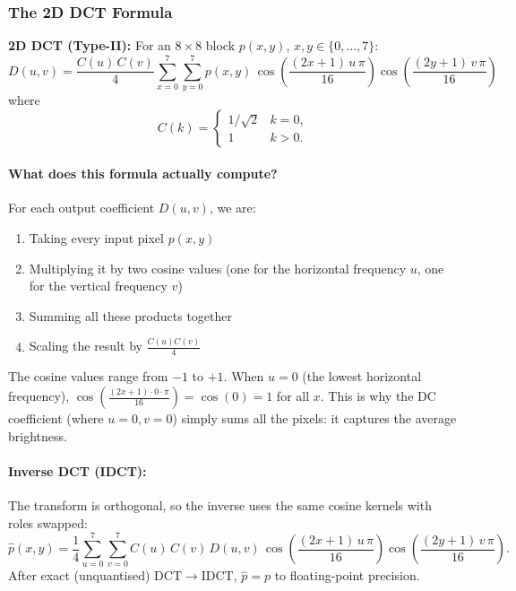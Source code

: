 \subsubsection{The 2D DCT Formula}

\begin{definitionbox}
\textbf{2D DCT (Type-II):} For an $8\times8$ block $p(x,y)$, $x,y\in\{0,\ldots,7\}$:
\begin{equation}
\boxed{
  D(u,v) = \frac{C(u)\,C(v)}{4}
  \sum_{x=0}^{7}\sum_{y=0}^{7}
  p(x,y)\,
  \cos\!\left(\frac{(2x+1)\,u\,\pi}{16}\right)
  \cos\!\left(\frac{(2y+1)\,v\,\pi}{16}\right)
}
\label{eq:dct}
\end{equation}
where
\begin{equation}
  C(k) = \begin{cases} 1/\sqrt{2} & k=0, \\ 1 & k > 0. \end{cases}
\end{equation}
\end{definitionbox}

\paragraph{What does this formula actually compute?}

For each output coefficient $D(u,v)$, we are:
\begin{enumerate}[nosep]
    \item Taking every input pixel $p(x,y)$
    \item Multiplying it by two cosine values (one for the horizontal frequency $u$, one for the vertical frequency $v$)
    \item Summing all these products together
    \item Scaling the result by $\frac{C(u)C(v)}{4}$
\end{enumerate}

The cosine values range from $-1$ to $+1$. When $u=0$ (the lowest horizontal frequency), $\cos(\frac{(2x+1)\cdot0\cdot\pi}{16}) = \cos(0) = 1$ for all $x$. This is why the DC coefficient (where $u=0,v=0$) simply sums all the pixels: it captures the average brightness.

\paragraph{Inverse DCT (IDCT):} The transform is orthogonal, so the inverse uses the same cosine kernels with roles swapped:
\begin{equation}
  \hat{p}(x,y) = \frac{1}{4}
  \sum_{u=0}^{7}\sum_{v=0}^{7}
  C(u)\,C(v)\,D(u,v)\,
  \cos\!\left(\frac{(2x+1)\,u\,\pi}{16}\right)
  \cos\!\left(\frac{(2y+1)\,v\,\pi}{16}\right).
  \label{eq:idct}
\end{equation}
After exact (unquantised) DCT$\to$IDCT, $\hat{p}=p$ to floating-point precision.

